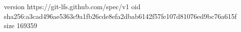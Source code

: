 version https://git-lfs.github.com/spec/v1
oid sha256:a3cad496ae5363c9a1fb26cde8efa2dbab6142f57fe107d81076ed9bc76a615f
size 169359
